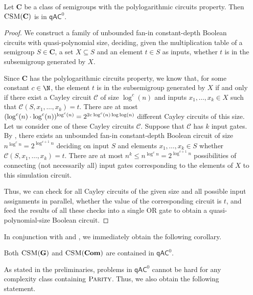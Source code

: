 \documentclass{toc}
\renewcommand{\leq}{\leqslant}
\renewcommand{\le}{\leq}
\newcommand{\qAC}{\ensuremath{\mathsf{qAC}}}
\newcommand{\vC}{\mathbf{C}}
\newcommand{\vCom}{\mathbf{Com}}
\newcommand{\vG}{\mathbf{G}}
\newcommand{\CSM}{\ensuremath{\textsc{CSM}}}
\newcommand{\Parity}{\ensuremath{\textsc{Parity}}}
\renewcommand{\C}{\ensuremath{\mathcal{C}}}
\newcommand{\SPLCP}{polylogarithmic circuits property}
\newcommand{\ms}{\hspace*{0.5pt}}
\begin{document}
\begin{theorem}
  Let $\vC$ be a class of semigroups with the {\SPLCP}.
  Then $\CSM(\vC)$ is in $\qAC^0$.
  \label{thm:qACzero}
\end{theorem}
%
\begin{proof}
  We construct a family of unbounded fan-in constant-depth Boolean circuits
  with quasi-polynomial size, deciding, given the multiplication table of a
  semigroup $S \in \vC$, a set $X \subseteq S$ and an element $t \in S$ as
  inputs, whether $t$ is in the subsemigroup generated by $X$.

  Since $\vC$ has the {\SPLCP}, we know that, for some constant $c \in \N$, the
  element $t$ is in the subsemigroup generated by $X$ if and only if there
  exist a Cayley circuit $\C$ of size $\log^c(n)$ and inputs $x_1, \dots, x_k
  \in X$ such that $\C(S, x_1, \dots, x_k) = t$.
  There are at most $(\log^{c}(n) \cdot \log^{c}(n))^{\log^c(n)} = 2^{2c \ms
  \log^c(n) \log \log(n)}$ different Cayley circuits of this size.
  Let us consider one of these Cayley circuits $\C$. Suppose that $\C$ has $k$
  input gates.
  By , there exists an unbounded fan-in
  constant-depth Boolean circuit of size $n^{\log^c n} = 2^{\log^{c+1} n}$
  deciding on input $S$ and elements $x_1, \dots, x_k \in S$ whether $\C(S,
  x_1, \dots, x_k) = t$.
  There are at most $n^k \le n^{\log^c n} = 2^{\log^{c+1} n}$ possibilities of
  connecting (not necessarily all) input gates corresponding to the elements of
  $X$ to this simulation circuit.

  Thus, we can check for all Cayley circuits of the given size and all possible
  input assignments in parallel, whether the value of the corresponding circuit
  is $t$, and feed the results of all these checks into a single OR gate to
  obtain a quasi-polynomial-size Boolean circuit.
\end{proof}

In conjunction with  and , we
immediately obtain the following corollary.

\begin{corollary}
  Both $\CSM(\vG)$ and $\CSM(\vCom)$ are contained in $\qAC^0$.
  \label{crl:qACzero}
\end{corollary}

As stated in the preliminaries, problems in $\qAC^0$ cannot be hard for any
complexity class containing $\Parity$. Thus, we also obtain the following
statement.
\end{document}
